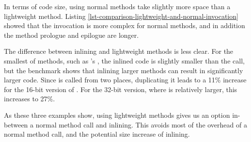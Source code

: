 In terms of code size, using normal methods take slightly more space than a lightweight method. Listing \ref{lst-comparison-lightweight-and-normal-invocation} showed that the invocation is more complex for normal methods, and in addition the method prologue and epilogue are longer.

The difference between inlining and lightweight methods is less clear. For the smallest of methods, such as 's , the inlined code is slightly smaller than the call, but the  benchmark shows that inlining larger methods can result in significantly larger code. Since  is called from two places, duplicating it leads to a 11\% increase for the 16-bit version of . For the 32-bit version, where  is relatively larger, this increases to 27\%.

As these three examples show, using lightweight methods gives us an option in-between a normal method call and inlining. This avoids most of the overhead of a normal method call, and the potential size increase of inlining.


